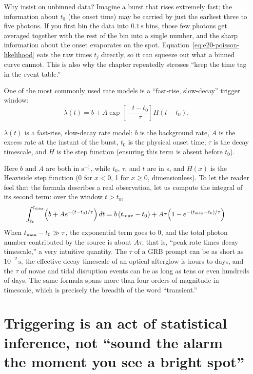 Why insist on unbinned data? Imagine a burst that rises extremely fast; the information about \(t_0\) (the onset time) may be carried by just the earliest three to five photons. If you first bin the data into \(0.1\,\mathrm{s}\) bins, those few photons get averaged together with the rest of the bin into a single number, and the sharp information about the onset evaporates on the spot. Equation~\eqref{eq:e20-poisson-likelihood} eats the raw times \(t_j\) directly, so it can squeeze out what a binned curve cannot. This is also why the chapter repeatedly stresses ``keep the time tag in the event table.''

One of the most commonly used rate models is a ``fast-rise, slow-decay'' trigger window:
\begin{equation}
  \lambda(t)=b+A\exp\!\left[-\frac{t-t_0}{\tau}\right]H(t-t_0),
  \label{eq:e20-exponential-rate}
\end{equation}
\begin{formulaexplain}
\(\lambda(t)\) is a fast-rise, slow-decay rate model: \(b\) is the background rate, \(A\) is the excess rate at the instant of the burst, \(t_0\) is the physical onset time, \(\tau\) is the decay timescale, and \(H\) is the step function (ensuring this term is absent before \(t_0\)).
\end{formulaexplain}
Here \(b\) and \(A\) are both in \(\mathrm{s^{-1}}\), while \(t_0\), \(\tau\), and \(t\) are in s, and \(H(x)\) is the Heaviside step function (0 for \(x<0\), 1 for \(x\ge0\), dimensionless). To let the reader feel that the formula describes a real observation, let us compute the integral of its second term: over the window \(t>t_0\),
\[
  \int_{t_0}^{t_{\rm max}}\!\Big(b+Ae^{-(t-t_0)/\tau}\Big)\,dt
  = b\,(t_{\rm max}-t_0)+A\tau\Big(1-e^{-(t_{\rm max}-t_0)/\tau}\Big).
\]
When \(t_{\rm max}-t_0\gg\tau\), the exponential term goes to 0, and the total photon number contributed by the source is about \(A\tau\), that is, ``peak rate times decay timescale,'' a very intuitive quantity. The \(\tau\) of a GRB prompt can be as short as \(10^{-2}\,\mathrm{s}\), the effective decay timescale of an optical afterglow is hours to days, and the \(\tau\) of novae and tidal disruption events can be as long as tens or even hundreds of days. The same formula spans more than four orders of magnitude in timescale, which is precisely the breadth of the word ``transient.''

\section{Triggering is an act of statistical inference, not ``sound the alarm the moment you see a bright spot''}
\label{sec:e20-trigger}

